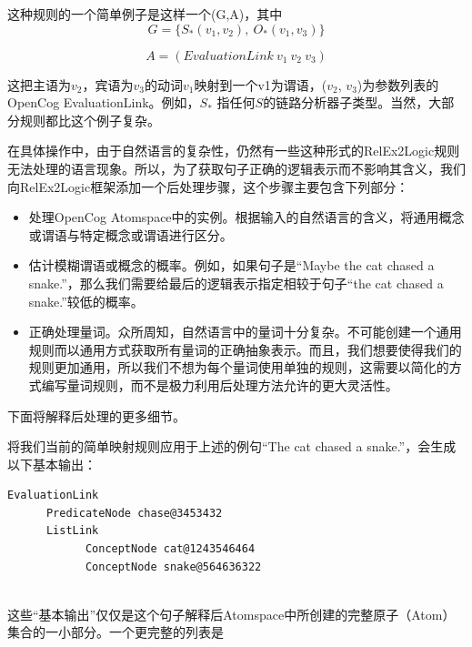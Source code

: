 这种规则的一个简单例子是这样一个(G,A)，其中
$$
G = \{ S_*(v_1,v_2), \ O_*(v_1, v_3) \}
$$

$$
A = (EvaluationLink \ v_1 \ v_2 \ v_3)
$$

这把主语为$v_2$，宾语为$v_3$的动词$v_1$映射到一个v1为谓语，($v_2$, $v_3$)为参数列表的OpenCog EvaluationLink。例如，$S_*$ 指任何$S$的链路分析器子类型。当然，大部分规则都比这个例子复杂。

在具体操作中，由于自然语言的复杂性，仍然有一些这种形式的RelEx2Logic规则无法处理的语言现象。所以，为了获取句子正确的逻辑表示而不影响其含义，我们向RelEx2Logic框架添加一个后处理步骤，这个步骤主要包含下列部分：

\begin{itemize}
\item 处理OpenCog Atomspace中的实例。根据输入的自然语言的含义，将通用概念或谓语与特定概念或谓语进行区分。
\item 估计模糊谓语或概念的概率。例如，如果句子是“Maybe the cat chased a snake.”，那么我们需要给最后的逻辑表示指定相较于句子“the cat chased a snake.”较低的概率。
\item 正确处理量词。众所周知，自然语言中的量词十分复杂。不可能创建一个通用规则而以通用方式获取所有量词的正确抽象表示。而且，我们想要使得我们的规则更加通用，所以我们不想为每个量词使用单独的规则，这需要以简化的方式编写量词规则，而不是极力利用后处理方法允许的更大灵活性。
\end{itemize}

下面将解释后处理的更多细节。

将我们当前的简单映射规则应用于上述的例句“The cat chased a snake.”，会生成以下基本输出：

 {\tt\begin{small}\begin{lstlisting}
EvaluationLink 
      PredicateNode chase@3453432
      ListLink
            ConceptNode cat@1243546464
            ConceptNode snake@564636322
       
\end{lstlisting}\end{small}}

这些“基本输出”仅仅是这个句子解释后Atomspace中所创建的完整原子（Atom）集合的一小部分。一个更完整的列表是

